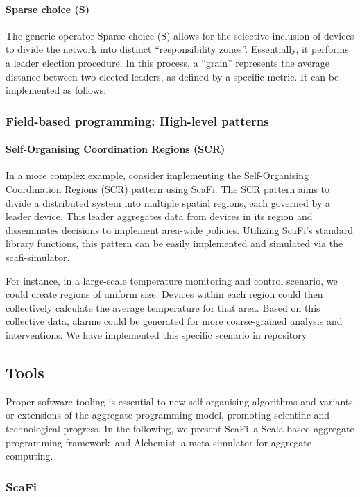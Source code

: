\paragraph*{Sparse choice (S)}
The generic operator Sparse choice (S) 
 allows for the selective inclusion of devices to divide the network into distinct ``responsibility zones''. Essentially, it performs a leader election procedure. 
 In this process, a ``grain'' represents the average distance between two elected leaders, as defined by a specific metric. It can be implemented as follows:
\subsubsection{Field-based programming: High-level patterns}
\paragraph*{Self-Organising Coordination Regions (SCR)}
In a more complex example, consider implementing the Self-Organising Coordination Regions (SCR) pattern using ScaFi. The SCR pattern aims to divide a distributed system into multiple spatial regions, each governed by a leader device. This leader aggregates data from devices in its region and disseminates decisions to implement area-wide policies. Utilizing ScaFi's standard library functions, this pattern can be easily implemented and simulated via the scafi-simulator.

For instance, in a large-scale temperature monitoring and control scenario, we could create regions of uniform size. Devices within each region could then collectively calculate the average temperature for that area. Based on this collective data, alarms could be generated for more coarse-grained analysis and interventions. We have implemented this specific scenario in repository 
\subsection{Tools}
Proper software tooling
is essential to new self-organising algorithms
and variants or extensions of the aggregate programming model,
promoting scientific and technological progress.
In the following, we present ScaFi--a Scala-based aggregate programming framework--and Alchemist--a meta-simulator for aggregate computing.
\subsubsection{ScaFi}\label{sec:scafi}


